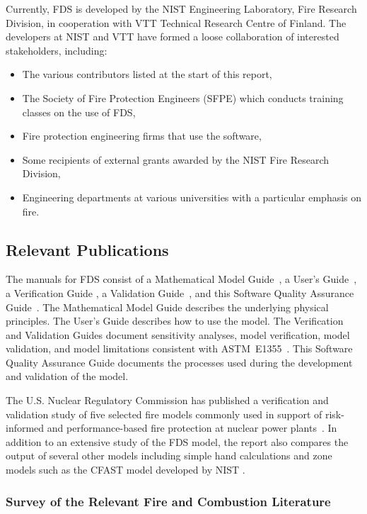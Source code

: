 \documentclass[11pt]{book}
\begin{document}
Currently, FDS is developed by the NIST Engineering Laboratory, Fire Research Division, in cooperation with VTT Technical Research Centre of Finland. The developers at NIST and VTT have formed a loose collaboration of interested stakeholders, including:
\begin{itemize}
\item The various contributors listed at the start of this report,
\item The Society of Fire Protection Engineers (SFPE) which conducts training classes on the use of FDS,
\item Fire protection engineering firms that use the software,
\item Some recipients of external grants awarded by the NIST Fire Research Division,
\item Engineering departments at various universities with a particular emphasis on fire.
\end{itemize}

\subsection{Relevant Publications}

The manuals for FDS consist of a Mathematical Model Guide~\cite{FDS_Math_Guide}, a User's Guide~\cite{FDS_Users_Guide}, a Verification Guide \cite{FDS_Verification_Guide}, a Validation Guide~\cite{FDS_Validation_Guide}, and this Software Quality Assurance Guide~\cite{SQA_Guide}.  The Mathematical Model Guide describes the underlying physical principles. The User's Guide describes how to use the model. The Verification and Validation Guides document sensitivity analyses, model verification, model validation, and model limitations consistent with ASTM~E1355~\cite{ASTM:E1355}. This Software Quality Assurance Guide documents the processes used during the development and validation of the model.

The U.S. Nuclear Regulatory Commission has published a verification and validation study of five selected fire models commonly used in support of risk-informed and performance-based fire protection at nuclear power plants~\cite{NRCNUREG1824}. In addition to an extensive study of the FDS model, the report also compares the output of several other models including simple hand calculations and zone models such as the CFAST model developed by NIST \cite{CFAST_Tech_Guide_7}.

\subsubsection{Survey of the Relevant Fire and Combustion Literature}
\end{document}
